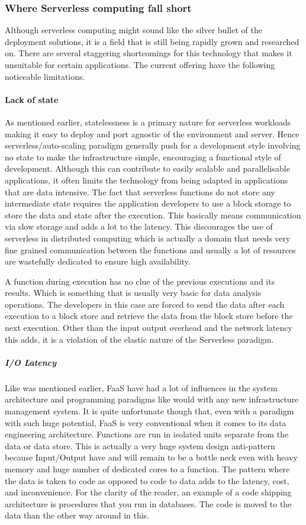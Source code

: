 \documentclass[12pt,titlepage]{article}
\begin{document}
\subsubsection{Where Serverless computing fall short}
\label{sec:org459a452}
Although serverless computing might sound like the silver bullet of the
deployment solutions, it is a field that is still being rapidly grown and
researched on. There are several staggering shortcomings for this technology
that makes it unsuitable for certain applications. The current offering have the
following noticeable limitations.
\paragraph{Lack of state}
\label{sec:orga784d7c}
As mentioned earlier, statelessness is a primary nature for serverless workloads
making it easy to deploy and port agnostic of the environment and server.
Hence serverless/auto-scaling paradigm generally push for a development style
involving no state to make the infrastructure simple, encouraging a functional
style of development. Although this can contribute to easily scalable and
parallelisable applications, it often limits the technology from being adapted
in applications that are data intensive.
The fact that serverless functions do not store any intermediate state requires
the application developers to use a block storage to store the data and state
after the execution. This basically means communication via slow storage and
adds a lot to the latency. This discourages the use of serverless in distributed
computing which is actually a domain that needs very fine grained communication
between the functions and usually a lot of resources are wastefully dedicated to
ensure high availability.

A function during execution has no clue of the previous executions and its
results. Which is something that is usually very basic for data analysis
operations. The developers in this case are forced to send the data after each
execution to a block store and retrieve the data from the block store before the
next execution. Other than the input output overhead and the network latency
this adds, it is a violation of the elastic nature of the Serverless
paradigm.

\subparagraph{I/O Latency}
\label{sec:orgc506a48}
Like was mentioned earlier, FaaS have had a lot of influences in the system
architecture and programming paradigms like would with any new infrastructure
management system. It is quite unfortunate though that, even with a paradigm
with such huge potential, FaaS is very conventional when it comes to its data
engineering architecture. Functions are run in isolated units separate from the
data or data store. This is actually a very huge system design anti-pattern
because Input/Output have and will remain to be a bottle neck even with heavy
memory and huge number of dedicated cores to a function. The pattern where the
data is taken to code as opposed to code to data adds to the latency, cost, and
inconvenience. For the clarity of the reader, an example of a code shipping
architecture is procedures that you run in databases. The code is moved to the
data than the other way around in this.
\end{document}

